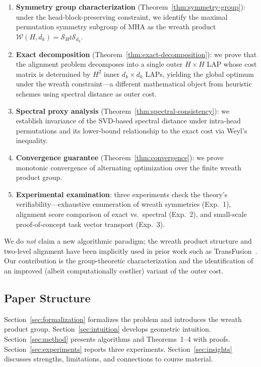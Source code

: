 \begin{enumerate}[label=(\arabic*)]
    \item \textbf{Symmetry group characterization} (Theorem~\ref{thm:symmetry-group}): under the head-block-preserving constraint, we identify the maximal permutation symmetry subgroup of MHA as the wreath product $\mathcal{W}(H,d_k) = \mathcal{S}_H \wr \mathcal{S}_{d_k}$.
    \item \textbf{Exact decomposition} (Theorem~\ref{thm:exact-decomposition}): we prove that the alignment problem decomposes into a single outer $H \times H$ LAP whose cost matrix is determined by $H^2$ inner $d_k \times d_k$ LAPs, yielding the global optimum under the wreath constraint---a different mathematical object from heuristic schemes using spectral distance as outer cost.
    \item \textbf{Spectral proxy analysis} (Theorem~\ref{thm:spectral-consistency}): we establish invariance of the SVD-based spectral distance under intra-head permutations and its lower-bound relationship to the exact cost via Weyl's inequality.
    \item \textbf{Convergence guarantee} (Theorem~\ref{thm:convergence}): we prove monotonic convergence of alternating optimization over the finite wreath product group.
    \item \textbf{Experimental examination}: three experiments check the theory's verifiability---exhaustive enumeration of wreath symmetries (Exp.~1), alignment score comparison of exact vs.\ spectral (Exp.~2), and small-scale proof-of-concept task vector transport (Exp.~3).
\end{enumerate}

We do \emph{not} claim a new algorithmic paradigm; the wreath product structure and two-level alignment have been implicitly used in prior work such as TransFusion~\cite{Rinaldi2025}. Our contribution is the group-theoretic characterization and the identification of an improved (albeit computationally costlier) variant of the outer cost.

\subsection{Paper Structure}

Section~\ref{sec:formalization} formalizes the problem and introduces the wreath product group. Section~\ref{sec:intuition} develops geometric intuition. Section~\ref{sec:method} presents algorithms and Theorems~1--4 with proofs. Section~\ref{sec:experiments} reports three experiments. Section~\ref{sec:insights} discusses strengths, limitations, and connections to course material.

